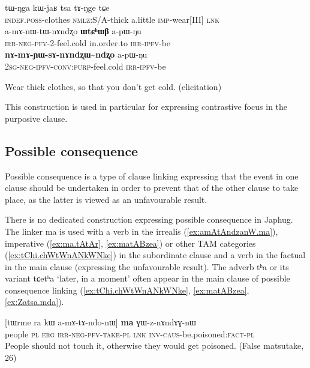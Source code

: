 \documentclass[oldfontcommands,oneside,a4paper,11pt]{article}
\newcommand{\ipa}[1]{{\phon \mbox{#1}}} %
\newcommand{\refb}[1]{(\ref{#1})}
\begin{document}
\begin{exe}
\ex \begin{xlist}
 \ex \label{ex:WtChWB.supporting2}  
\gll 
 \ipa{tɯ-ŋga}    	\ipa{kɯ-jaʁ}    	\ipa{tsa}    	\ipa{tɤ-ŋge} \ipa{tɕe}\\
 \textsc{indef.poss}-clothes \textsc{nmlz}:S/A-thick a.little \textsc{imp}-wear[III]  \textsc{lnk}\\ 
 \ex \label{ex:WtChWB.apWNu}  
\gll 
 	\ipa{a-mɤ-nɯ-tɯ-nɤndʐo}    	\ipa{\textbf{ɯtɕʰɯβ}}    	\ipa{a-pɯ-ŋu}    	\\
  \textsc{irr-neg-pfv}-2-feel.cold in.order.to \textsc{irr-ipfv}-be \\
\ex \label{ex:nAmAYWznAnAndzxWndzxo.apWNu}
\gll
\ipa{\textbf{nɤ-mɤ-ɲɯ-sɤ-nɤndʐɯ\textasciitilde{}ndʐo}}    	\ipa{a-pɯ-ŋu}\\
 \textsc{2sg-neg-ipfv-conv:purp}-feel.cold \textsc{irr-ipfv}-be\\
  \end{xlist}
\glt Wear thick clothes, so that you don't get cold. (elicitation)
 \end{exe}

This construction is used in particular for expressing contrastive focus in the purposive clause.



\subsection{Possible consequence} \label{sec:possible.consequence}
Possible consequence is a type of clause linking expressing that the event in one clause should be undertaken in order to prevent that of the other clause to take place, as the latter is viewed as an unfavourable result. 
 
 There is no  dedicated construction expressing possible consequence in Japhug. The linker \ipa{ma} is used with a verb in the irrealis \refb{ex:amAtAndzanW.ma}, imperative (\ref{ex:ma.tAtAr}, \ref{ex:matABzea}) or other TAM categories \refb{ex:tChi.chWtWnANkWNke} in the subordinate clause and a verb in the factual in the main clause (expressing the unfavourable result). The adverb \ipa{tʰa} or its variant \ipa{tɕetʰa} `later, in a moment' often appear in the main clause of possible consequence linking (\ref{ex:tChi.chWtWnANkWNke}, \ref{ex:matABzea}, \ref{ex:Zatsa.mda}).
 
 
 \begin{exe}
\ex \label{ex:amAtAndzanW.ma}
\gll 
[\ipa{tɯrme}    	\ipa{ra}    	\ipa{kɯ}    	\ipa{a-mɤ-tɤ-ndo-nɯ]}    	\ipa{\textbf{ma}}    	\ipa{ɣɯ-z-nɤndɤɣ-nɯ}        \\
people \textsc{pl} \textsc{erg} \textsc{irr-neg-pfv-take}-\textsc{pl} \textsc{lnk} \textsc{inv-caus}-be.poisoned\textsc{:fact}-\textsc{pl} \\
\glt People should not touch it, otherwise they would get poisoned. (False matsutake, 26)
 \end{exe}
 
\end{document}
